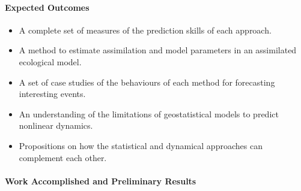 \paragraph{Expected Outcomes}

\begin{itemize}
\item A complete set of measures of the prediction skills of each approach.
\item A method to estimate assimilation and model parameters in an assimilated ecological model.
\item A set of case studies of the behaviours of each method for forecasting interesting events.
\item An understanding of the limitations of geostatistical models to predict nonlinear dynamics. 
\item Propositions on how the statistical and dynamical approaches can complement each other.
\end{itemize}

\paragraph{Work Accomplished and Preliminary Results}

